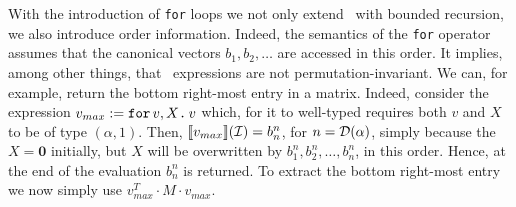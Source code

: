 %
%
With the introduction of \texttt{for} loops we not only extend \lang\ with bounded recursion, we also introduce order information. Indeed, the semantics of the \texttt{for} operator assumes that the canonical vectors $b_1,b_2,\ldots$
are accessed in this order. It implies, among other things, that \langfor\ expressions are not permutation-invariant.
We can, for example, return the bottom right-most entry in a matrix. Indeed, consider the expression $v_{max} := \texttt{for}\, v,X \texttt{.}\, v$ which, for it to well-typed requires both $v$ and $X$ to be of type $(\alpha,1)$. Then, $\llbracket v_{max} \rrbracket(\mathcal{I})=b_n^n$, for $n=\mathcal{D}(\alpha)$, simply because the $X=\mathbf{0}$ initially, but $X$ will be overwritten by $b_1^n,b_2^n,\ldots,b_n^n$, in this order. Hence, at the end of the evaluation $b_n^n$ is returned.
To extract the bottom right-most entry we now simply use $v_{max}^T\cdot M\cdot v_{max}$.


%

